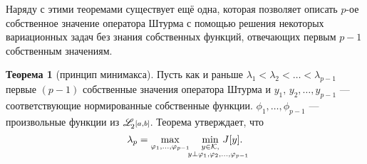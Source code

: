 \documentclass[12pt,a4paper,openany,fleqn]{book}
\newcommand{\mc}[1]{\ensuremath{\mathcal{#1}}}
\newcommand{\K}{\mc{K}}
\newcommand{\fL}[1][{[a,b]}]{\ensuremath{\mathscr{L}\hspace*{-0.11 cm}{\mathstrut}_{2}{\scriptstyle#1}}}
\theoremstyle{definition}
\newtheorem{_teor}{Теорема}[section]
\begin{document}
Наряду с этими теоремами существует ещё одна, которая позволяет описать $p$-ое собственное значение оператора Штурма с помощью решения некоторых вариационных задач без знания собственных функций, отвечающих первым $p-1$ собственным значениям.
\begin{_teor}[принцип минимакса]
	\label{l5:s2:teor:4}
	Пусть как и раньше $\lambda_1<\lambda_2<\ldots<\lambda_{p-1}$ первые $(p-1)$ собственные значения оператора Штурма и $y_1,\,y_2,\ldots,y_{p-1}$ --- соответствующие нормированные собственные функции. $\phi_1,\ldots,\phi_{p-1}$ --- произвольные функции из $\fL$. Теорема утверждает, что
	\begin{equation}
		\label{l5:eq:12}
		\hfill\lambda_p=\max\limits_{\phi_1,\ldots,\phi_{p-1}}\quad\min\limits_{\substack{y\in\K,\\\lefteqn{\scriptstyle \hspace*{-0.8cm}y\perp\phi_1,\phi_2,\ldots,\phi_{p-1}}}}\,J[y].\hfill
	\end{equation}
\end{_teor}
\end{document}
